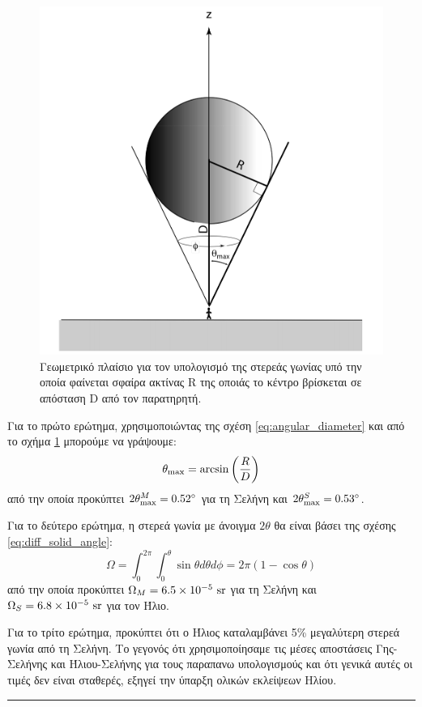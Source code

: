 \begin{figure}[h]
    \centering
    \includegraphics[scale=0.5]{Figures/solid_angle_problem.png}
    \caption{Γεωμετρικό πλαίσιο για τον υπολογισμό της στερεάς γωνίας υπό την οποία φαίνεται σφαίρα ακτίνας R της οποιάς το κέντρο βρίσκεται σε απόσταση D από τον παρατηρητή.}
    \label{fig:solid_angle_problem}
\end{figure}

Για το πρώτο ερώτημα, χρησιμοποιώντας της σχέση \eqref{eq:angular_diameter} και από το σχήμα \ref{fig:solid_angle_problem} μπορούμε να γράψουμε:
$$\theta_{\rm max} = \arcsin \left( \frac{R}{D} \right)$$ από την οποία προκύπτει $2\theta_{\rm max}^{M} = 0.52^{\circ}$ για τη Σελήνη και $2\theta_{\rm max}^{S} = 0.53^{\circ}$.

Για το δεύτερο ερώτημα, η στερεά γωνία με άνοιγμα $2\theta$ θα είναι βάσει της σχέσης \eqref{eq:diff_solid_angle}:
$$\Omega = \int_{0}^{2\pi} \int_{0}^{\theta} \sin \theta d \theta d \phi = 2\pi (1 - \cos \theta)$$ από την οποία προκύπτει $\Omega_M = 6.5 \times 10^{-5} \ \rm sr$ για τη Σελήνη και $\Omega_S = 6.8 \times 10^{-5} \ \rm sr$ για τον Ήλιο.

Για το τρίτο ερώτημα, προκύπτει ότι ο Ήλιος καταλαμβάνει 5\% μεγαλύτερη στερεά γωνία από τη Σελήνη. Το γεγονός ότι χρησιμοποίησαμε τις μέσες αποστάσεις Γης-Σελήνης και Ήλιου-Σελήνης για τους παραπανω υπολογισμούς και ότι γενικά αυτές οι τιμές δεν είναι σταθερές, εξηγεί την ύπαρξη ολικών εκλείψεων Ηλίου.
{\hrule}



